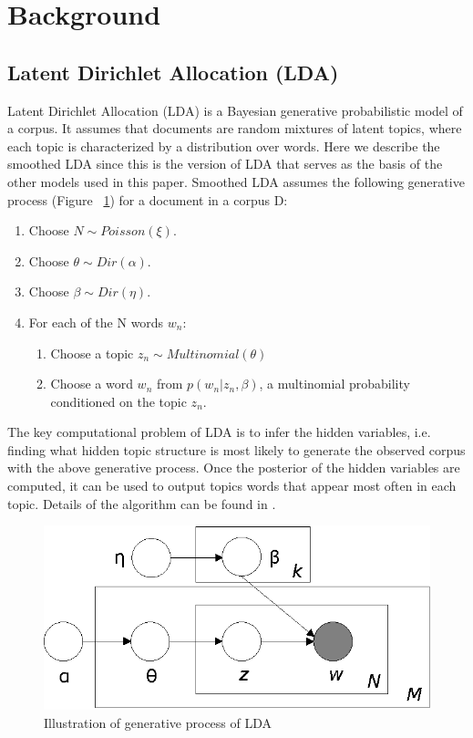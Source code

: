 \documentclass[DIV=calc, paper=letter, fontsize=10pt, twocolumn]{scrartcl}	 %
\begin{document}
\section*{Background}

\subsection*{Latent Dirichlet Allocation (LDA)}
Latent Dirichlet Allocation (LDA) \cite{1} is a Bayesian generative probabilistic model of a corpus. It assumes that documents are random mixtures of latent topics, where each topic is characterized by a distribution over words. Here we describe the smoothed LDA since this is the version of LDA that serves as the basis of the other models used in this paper.
Smoothed LDA assumes the following generative process (Figure ~\ref{fig: LDA}) for a document in a corpus D:
\begin{enumerate}
  \item Choose $N \sim Poisson(\xi)$.
  \item Choose $\theta \sim Dir(\alpha)$.
  \item Choose $\beta \sim Dir(\eta)$.
  \item For each of the N words $w_n$:
  	\begin{enumerate}
  	  	\item Choose a topic $z_n \sim  Multinomial(\theta)$
    		\item Choose a word $w_n$ from $p(w_n|z_n, \beta)$, a multinomial probability conditioned on the topic $z_n$.
  	\end{enumerate}
\end{enumerate}
The key computational problem of LDA is to infer the hidden variables, i.e. finding what hidden topic structure is most likely to generate the observed corpus with the above generative process. Once the posterior of the hidden variables are computed, it can be used to output topics words that appear most often in each topic. Details of the algorithm can be found in \cite{1}.
			\begin{figure}[!ht]
				\centerline{\includegraphics[scale = 0.8]{BleiNgJordan2003.eps}}
				\caption{Illustration of generative process of LDA \cite{1}}
				\label{fig: LDA}
			\end{figure}
\end{document}
